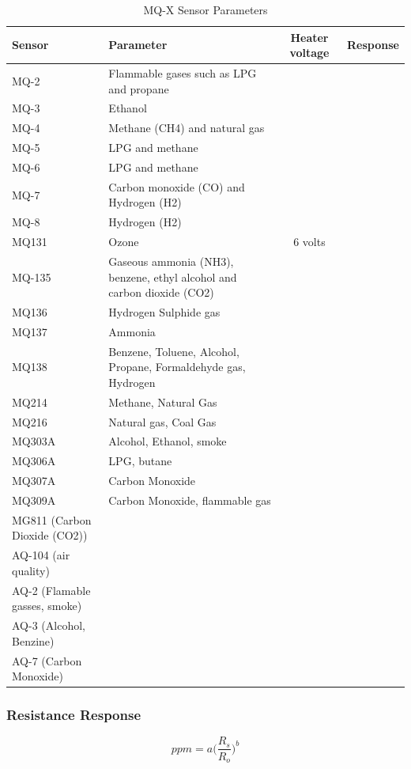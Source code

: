 \documentclass{article}\usepackage[]{graphicx}\usepackage[]{color}
\begin{document}
\begin{table}
\caption{MQ-X Sensor Parameters }
\begin{tabular}{lp{8cm}cc}\hline
Sensor  & Parameter       & Heater voltage   & Response \\ \hline\hline
MQ-2 & Flammable gases such as LPG and propane & & \\
MQ-3 & Ethanol && \\
MQ-4 & Methane (CH4) and natural gas && \\
MQ-5 & LPG and methane && \\
MQ-6 & LPG and methane && \\
MQ-7 & Carbon monoxide (CO) and Hydrogen (H2) && \\
MQ-8 & Hydrogen (H2) && \\
MQ131 & Ozone & 6 volts & \\
MQ-135 & Gaseous ammonia (NH3), benzene, ethyl alcohol and carbon dioxide (CO2) && \\
MQ136 & Hydrogen Sulphide gas  && \\
MQ137 & Ammonia  && \\
MQ138 & Benzene, Toluene, Alcohol, Propane, Formaldehyde gas, Hydrogen  && \\
MQ214 & Methane, Natural Gas  && \\
MQ216 & Natural gas, Coal Gas  && \\
MQ303A & Alcohol, Ethanol, smoke  && \\
MQ306A & LPG, butane  && \\
MQ307A &  Carbon Monoxide  && \\
MQ309A & Carbon Monoxide, flammable gas  && \\
MG811 (Carbon Dioxide (CO2)) && \\
AQ-104 (air quality) && \\
AQ-2 (Flamable gasses, smoke) && \\
AQ-3 (Alcohol, Benzine) && \\
AQ-7 (Carbon Monoxide) && \\
\hline
\end{tabular}
\end{table}

\subsubsection{Resistance Response}

\begin{equation}
ppm = a\bigg( \frac{R_s}{R_o}\bigg)^b
\end{equation}
\end{document}

